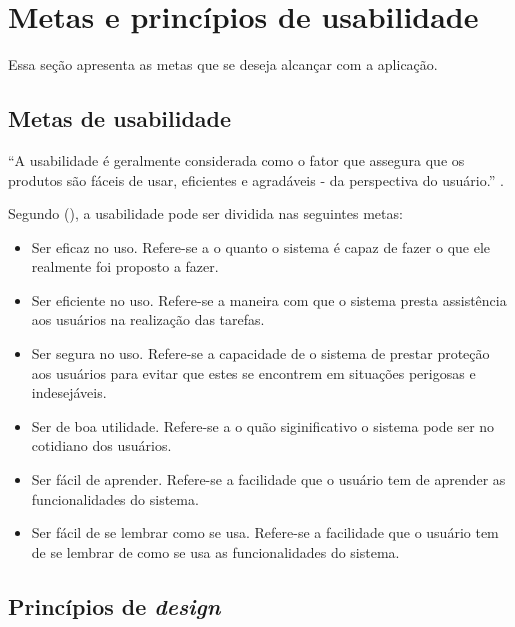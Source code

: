 \chapter{Metas e princípios de usabilidade}
  
  Essa seção apresenta as metas que se deseja alcançar com a aplicação.

  \section{Metas de usabilidade}
  
    “A usabilidade é geralmente considerada como o fator que assegura que os produtos são fáceis de usar, 
    eficientes e agradáveis - da perspectiva do usuário.” \cite{preece}.
    
    Segundo \citeauthor{preece} (\citeyear{preece}), a usabilidade pode ser dividida nas seguintes metas:
    
    \begin{itemize}
       \item Ser eficaz no uso.
       \subitem Refere-se a o quanto o sistema é capaz de fazer o que ele realmente foi proposto a fazer.
 
       \item Ser eficiente no uso.
       \subitem Refere-se a maneira com que o sistema presta assistência aos usuários na realização das tarefas.

       \item Ser segura no uso.
       \subitem Refere-se a capacidade de o sistema de prestar proteção aos usuários para evitar que estes se encontrem 
       em situações perigosas e indesejáveis.

       \item Ser de boa utilidade.
       \subitem Refere-se a o quão siginificativo o sistema pode ser no cotidiano dos usuários.

       \item Ser fácil de aprender.
       \subitem Refere-se a facilidade que o usuário tem de aprender as funcionalidades do sistema.

       \item Ser fácil de se lembrar como se usa.
       \subitem Refere-se a facilidade que o usuário tem de se lembrar de como se usa as funcionalidades do sistema.
    \end{itemize}
    
  \section{Princípios de \textit{design}}
  
